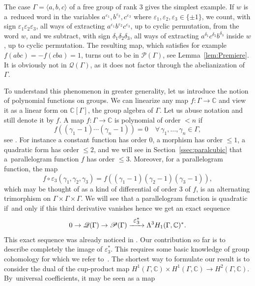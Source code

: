 \documentclass[JEP,XML,SOM,Unicode,NoEqCountersInSection]{cedram}
\let\mathcal\mathscr
\let\epsilon\varepsilon
\def\To#1{\mathchoice{\xrightarrow{\textstyle\kern4pt#1\kern3pt}}{\stackrel{#1}{\longrightarrow}}{}{}}
\theoremstyle{definition}
\newcommand{\CC}{\mathbb{C}}
\begin{document}
The case $\Gamma=\langle a,b,c\rangle$ of a free group of rank $3$ gives the
simplest example. If $w$ is a~reduced word in the variables
$a^{\epsilon_1},b^{\epsilon_2},c^{\epsilon_3}$
where $\epsilon_1,\epsilon_2,\epsilon_3\in\{\pm 1\}$,
we count, with sign
$\epsilon_1\epsilon_2\epsilon_3$, all ways of extracting
$a^{\epsilon_1} b^{\epsilon_2} c^{\epsilon_3}$, up to cyclic permutation,
from the word $w$, and we subtract, with sign $\delta_1\delta_2\delta_3$,
all ways of extracting $a^{\delta_1}c^{\delta_2}b^{\delta_3}$
inside $w$, up to cyclic permutation.
The resulting map, which satisfies for example $f(abc)=-f(cba)=1$, turns out
to be in $\mathcal{P}(\Gamma)$,
see Lemma~\ref{lem:Premiere}.
It is obviously not in $\mathcal{Q}(\Gamma)$,
as it does not factor through the abelianization of~$\Gamma$.

To understand this phenomenon in greater generality, let us introduce the
notion of polynomial functions on groups. We can linearize any map
$f:\Gamma\to \CC$ and view it as a linear form on $\CC[\Gamma]$, the
group algebra of $\Gamma$. Let us abuse notation and still denote it by $f$.
A map $f:\Gamma\to\CC$ is polynomial of order $< n$ if
\[ f((\gamma_1-1)\cdots(\gamma_n-1))=0\quad
\forall \,\gamma_1,\ldots,\gamma_n\in \Gamma, \]
see \eg \cite[Chap.\,5]{Passi}.
For instance a constant function has order $0$, a morphism has order
$\leq 1$, a quadratic form
has order $\leq 2$, and we will see in Section~\ref{ssec:paralcubic}
that a~parallelogram function $f$ has order $\leq 3$.
Moreover, for a parallelogram function, the map
\[ f\circ\varepsilon_3(\gamma_1,\gamma_2,\gamma_3)=
f((\gamma_1-1)(\gamma_2-1)(\gamma_3-1)), \]
which may be thought of as a kind of differential of order 3 of $f$,
is an alternating trimorphism on
$\Gamma\times\Gamma\times\Gamma$.
We will see that a parallelogram function is quadratic if~and only if
this third derivative vanishes hence we get an exact sequence
\begin{equation}\label{suiteexacteincomplete}
0\to\mathcal{Q}(\Gamma)\to \mathcal{P}(\Gamma)\To
{\varepsilon_3^*} \Lambda^3 H_1(\Gamma,\CC)^*.
\end{equation}
This exact sequence was already noticed in \cite{Chenevier,FriisStetkaer}.
Our contribution so far is to describe completely the image of $\varepsilon_3^*$.
This requires some basic knowledge of group cohomology for which we refer
to~\cite{Brown}. The shortest way to formulate our result is to consider
the dual of the cup-product map
$H^1(\Gamma,\CC) \times H^1(\Gamma,\CC)\to H^2(\Gamma,\CC)$.
By~universal coefficients, it may be seen as a map
\end{document}

